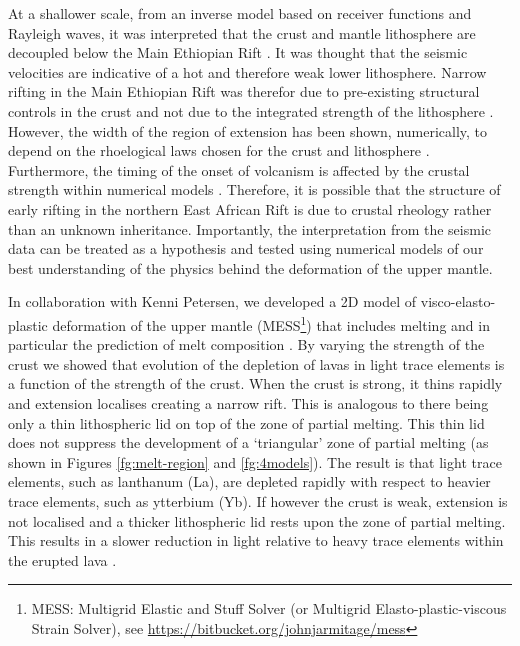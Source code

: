 At a shallower scale, from an inverse model based on receiver functions and Rayleigh waves, it was interpreted that the crust and mantle lithosphere are decoupled below the Main Ethiopian Rift \citep{keranen-etal-2009}. It was thought that the seismic velocities are indicative of a hot and therefore weak lower lithosphere. Narrow rifting in the Main Ethiopian Rift was therefor due to pre-existing structural controls in the crust and not due to the integrated strength of the lithosphere \citep{keranen-etal-2009}. However, the width of the region of extension has been shown, numerically, to depend on the rhoelogical laws chosen for the crust and lithosphere \citep[e.g.][]{buck-1991,brun-1999,brune-etal-2017}. Furthermore, the timing of the onset of volcanism is affected by the crustal strength within numerical models \citep{ros-etal-2017}. Therefore, it is possible that the structure of early rifting in the northern East African Rift is due to crustal rheology rather than an unknown inheritance. Importantly, the interpretation from the seismic data can be treated as a hypothesis and tested using numerical models of our best understanding of the physics behind the deformation of the upper mantle.

In collaboration with Kenni Petersen, we developed a 2D model of visco-elasto-plastic deformation of the upper mantle (MESS\footnote{MESS: Multigrid Elastic and Stuff Solver (or Multigrid Elasto-plastic-viscous Strain Solver), see \url{https://bitbucket.org/johnjarmitage/mess}}) that includes melting and in particular the prediction of melt composition \citep{petersen-etal-2015,armitage-etal-g3-2018}. By varying the strength of the crust we showed that evolution of the depletion of lavas in light trace elements is a function of the strength of the crust. When the crust is strong, it thins rapidly and extension localises creating a narrow rift. This is analogous to there being only a thin lithospheric lid on top of the zone of partial melting. This thin lid does not suppress the development of a `triangular' zone of partial melting (as shown in Figures \ref{fg:melt-region} and \ref{fg:4models}). The result is that light trace elements, such as lanthanum (La), are depleted rapidly with respect to heavier trace elements, such as ytterbium (Yb). If however the crust is weak, extension is not localised and a thicker lithospheric lid rests upon the zone of partial melting. This results in a slower reduction in light relative to heavy trace elements within the erupted lava \citep{armitage-etal-g3-2018}.

